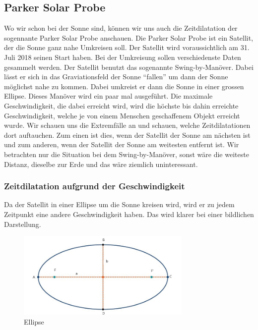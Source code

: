 \begin{refsection}
\subsection{Parker Solar Probe}
Wo wir schon bei der Sonne sind, können wir uns auch die Zeitdilatation der sogennante Parker Solar Probe anschauen. Die Parker Solar Probe ist ein Satellit, der die Sonne ganz nahe Umkreisen soll. Der Satellit wird voraussichtlich am 31. Juli 2018 seinen Start haben. Bei der Umkreisung sollen verschiedenste Daten gesammelt werden. Der Satellit benutzt das sogenannte Swing-by-Manöver. Dabei lässt er sich in das Graviationsfeld der Sonne ``fallen'' um dann der Sonne möglichst nahe zu kommen. Dabei umkreist er dann die Sonne in einer grossen Ellipse. Dieses Manöver wird ein paar mal ausgeführt. Die maximale Geschwindigkeit, die dabei erreicht wird, wird die höchste bis dahin erreichte Geschwindigkeit, welche je von einem Menschen geschaffenem Objekt erreicht wurde. Wir schauen uns die Extremfälle an und schauen, welche Zeitdilatationen dort auftauchen. Zum einen ist dies, wenn der Satellit der Sonne am nächsten ist und zum anderen, wenn der Satellit der Sonne am weitesten entfernt ist. Wir betrachten nur die Situation bei dem Swing-by-Manöver, sonst wäre die weiteste Distanz, dieselbe zur Erde und das wäre ziemlich uninteressant. 

\subsubsection{Zeitdilatation aufgrund der Geschwindigkeit}
Da der Satellit in einer Ellipse um die Sonne kreisen wird, wird er zu jedem Zeitpunkt eine andere Geschwindigkeit haben. Das wird klarer bei einer bildlichen Darstellung.
\begin{figure}[h]
\centering
\includegraphics[width=0.75\textwidth]{gps/pictures/Ellipse.jpg}
\caption{Ellipse}
\label{pic:ellipse}
\end{figure}


\end{refsection}

